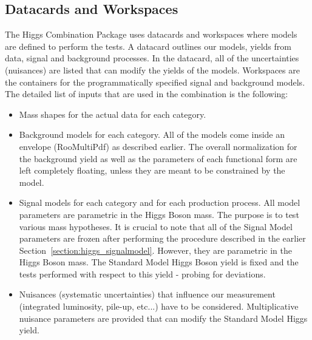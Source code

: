 \subsection{Datacards and Workspaces}
The Higgs Combination Package uses datacards and workspaces where models
are defined to perform the tests. A datacard outlines our models, yields
from data, signal and background processes. In the datacard, all
of the uncertainties (nuisances) are listed that can modify the yields of the models.
Workspaces are the containers for the programmatically specified signal and
background models. The detailed list of inputs that are used in the combination
 is the following:
\begin{itemize}
    \item Mass shapes for the actual data for each category.
    \item Background models for each category. All of the models come inside an envelope (RooMultiPdf) as described earlier. The overall normalization for the background yield as well as the parameters of each functional form are left completely floating, unless they are meant to be constrained by the model.
    \item Signal models for each category and for each production process. All model parameters are parametric in the Higgs Boson mass. The purpose is to test various mass hypotheses. It is crucial to note that all of the Signal Model parameters are frozen after performing the procedure described in the earlier Section~\ref{section:higgs_signalmodel}. However, they are parametric in the Higgs Boson mass. The Standard Model Higgs Boson yield is fixed and the tests performed with respect to this yield - probing for deviations.
    \item Nuisances (systematic uncertainties) that influence our measurement (integrated luminosity, pile-up, etc...) have to be considered. Multiplicative nuisance parameters are provided that can modify the Standard Model Higgs yield.
\end{itemize}

